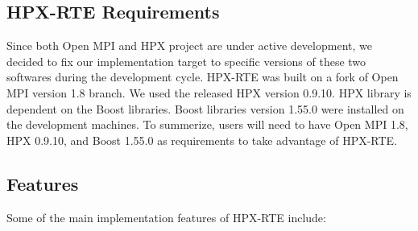 \subsection{HPX-RTE Requirements}
Since both Open MPI and HPX project are under active development, we decided to fix our implementation target to specific versions of these two softwares during the development cycle. HPX-RTE was built on a fork of Open MPI version 1.8 branch. We used the released HPX version 0.9.10. HPX library is dependent on the Boost libraries. Boost libraries version 1.55.0 were installed on the development machines.
To summerize, users will need to have Open MPI 1.8, HPX 0.9.10, and Boost 1.55.0 as requirements to take advantage of HPX-RTE.

\subsection{Features}
Some of the main implementation features of HPX-RTE include:

